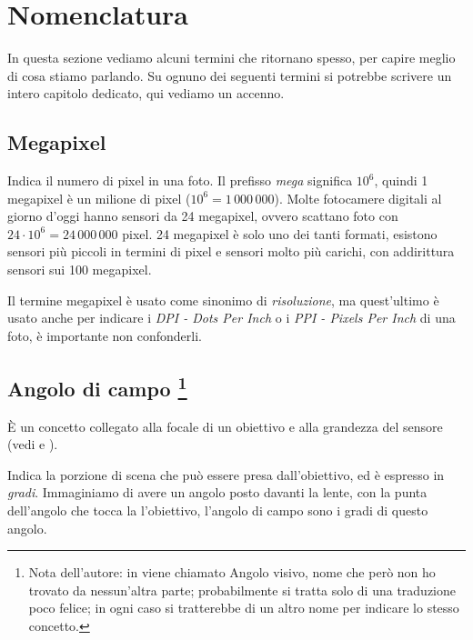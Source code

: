 \section{Nomenclatura} \label{sec:nomenclatura}

In questa sezione vediamo alcuni termini che ritornano spesso, per capire meglio di cosa stiamo parlando. Su ognuno dei seguenti termini si potrebbe scrivere un intero capitolo dedicato, qui vediamo un accenno.

\subsection{Megapixel} \label{subsec:megapixel}
Indica il numero di pixel in una foto. Il prefisso \textit{mega} significa $10^6$, quindi 1 megapixel è un milione di pixel ($10^6 = 1\,000\,000$).
Molte fotocamere digitali al giorno d'oggi hanno sensori da 24 megapixel, ovvero scattano foto con $24 \cdot 10^6 = 24\,000\,000$ pixel. 24 megapixel è solo uno dei tanti formati, esistono sensori più
piccoli in termini di pixel e sensori molto più carichi, con addirittura sensori sui 100 megapixel.

Il termine megapixel è usato come sinonimo di \textit{risoluzione}, ma quest'ultimo è usato anche per indicare i \textit{DPI - Dots Per Inch} o i \textit{PPI - Pixels Per Inch} di una foto, è importante non confonderli.


\subsection[Angolo di campo]{Angolo di campo \footnote{Nota dell'autore: in \cite{gatcum2017manuale} viene chiamato Angolo visivo, nome che però non ho trovato da nessun'altra parte; probabilmente si tratta solo di una traduzione poco felice; in ogni caso si tratterebbe di un altro nome per indicare lo stesso concetto.}} \label{subsec:angolocampo}

È un concetto collegato alla focale di un obiettivo e alla grandezza del sensore (vedi  e ).

Indica la porzione di scena che può essere presa dall'obiettivo, ed è espresso in \textit{gradi}. Immaginiamo di avere un angolo posto davanti la lente, con la punta dell'angolo che tocca la l'obiettivo,
l'angolo di campo sono i gradi di questo angolo.

